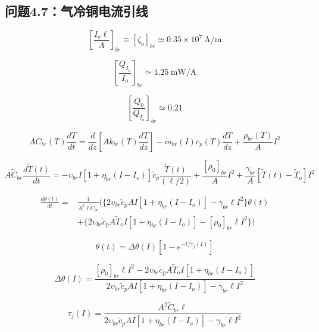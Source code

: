 \subsection{问题4.7：气冷铜电流引线}

\begin{equation}%
\left[\frac{I_o\ell}{A}\right]_{br}\equiv[\zeta_o]_{br}\simeq0.35\times 10^7\ \mathrm{A/m}
\end{equation}

\begin{equation}%
\left[\frac{Q_{I_o}}{I_o}\right]_{br}\simeq 1.25\ \mathrm{mW/A}
\end{equation}

\begin{equation}%
\left[\frac{Q_0}{Q_{I_o}}\right]_{br}\simeq 0.21
\end{equation}

\begin{equation}%
AC_{br}(T)\frac{dT}{dt}=\frac{d}{dz}\left[Ak_{br}(T)\frac{dT}{dz}\right]-\dot{m}_{br}(I)c_p(T)\frac{dT}{dz}+\frac{\rho_{br}(T)}{A}I^2
\end{equation}

\begin{equation}%
A\tilde{C}_{br}\frac{d\tilde{T}(t)}{dt}=-\upsilon_{br}I[1+\eta_{br}(I-I_o)]\tilde{c}_p\frac{\tilde{T}(t)}{(\ell/2)}+\frac{[\rho_0]_{br}}{A}I^2+\frac{\gamma_{br}}{A}[\tilde{T}(t)-\tilde{T}_o]I^2
\end{equation}

\begin{align}%
\frac{d\theta(t)}{dt}=&\frac{1}{A^2\ell\tilde{C}_{br}}(\{2\upsilon_{br}\tilde{c}_pAI[1+\eta_{br}(I-I_o)]-\gamma_{br}\ell I^2\}\theta(t) \\
&+\{2\upsilon_{br}\tilde{c}_pA\tilde{T}_oI[1+\eta_{br}(I-I_o)]-[\rho_0]_{br}\ell I^2\})
\end{align}

\begin{equation}%
\theta(t)=\Delta\theta(I)\left[1-e^{-t/\tau_j(I)}\right]
\end{equation}

\begin{equation}%
\Delta\theta(I)=\frac{[\rho_0]_{br}\ell I^2-2\upsilon_{br}\tilde{c}_pA\tilde{T}_oI[1+\eta_{br}(I-I_o)]}{2\upsilon_{br}\tilde{c}_pAI[1+\eta_{br}(I-I_o)]-\gamma_{br}\ell I^2}
\end{equation}

\begin{equation}%
\tau_j(I)=\frac{A^2\tilde{C}_{br}\ell}{2\upsilon_{br}\tilde{c}_pAI[1+\eta_{br}(I-I_o)]-\gamma_{br}\ell I^2}
\end{equation}

